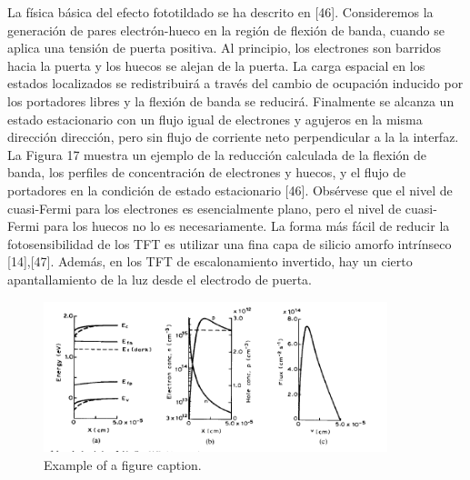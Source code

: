\documentclass[conference]{IEEEtran}
\begin{document}
    La física básica del efecto fototildado se ha descrito en [46]. Consideremos la generación de 
    pares electrón-hueco en la región de flexión de banda, cuando se aplica una tensión de puerta 
    positiva. Al principio, los electrones son barridos hacia la puerta y los huecos se alejan de 
    la puerta. La carga espacial en los estados localizados se redistribuirá a través del cambio 
    de ocupación inducido por los portadores libres y la flexión de banda se reducirá. Finalmente 
    se alcanza un estado estacionario con un flujo igual de electrones y agujeros en la misma 
    dirección dirección, pero sin flujo de corriente neto perpendicular a la la interfaz.
    \\
    La Figura 17 muestra un ejemplo de la reducción calculada de la flexión de banda, los perfiles 
    de concentración de electrones y huecos, y el flujo de portadores en la condición de estado 
    estacionario [46]. Obsérvese que el nivel de cuasi-Fermi para los electrones es esencialmente 
    plano, pero el nivel de cuasi-Fermi para los huecos no lo es necesariamente. La forma más 
    fácil de reducir la fotosensibilidad de los TFT es utilizar una fina capa de silicio amorfo 
    intrínseco [14],[47]. Además, en los TFT de escalonamiento invertido, hay un cierto 
    apantallamiento de la luz desde el electrodo de puerta.

\begin{figure}[htbp]
    \centerline{\includegraphics[width=10.0cm]{img/imagen-17.png}}
    \caption{Example of a figure caption.}%
    \label{fig17}
\end{figure}  
\end{document}
